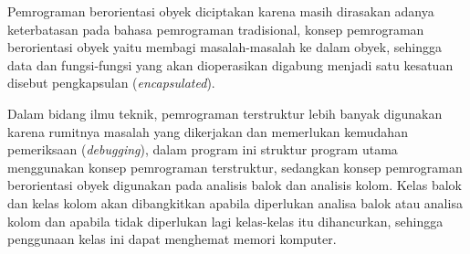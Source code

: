 Pemrograman berorientasi obyek diciptakan karena masih dirasakan adanya
keterbatasan pada bahasa pemrograman tradisional, konsep pemrograman
berorientasi obyek yaitu membagi masalah-masalah ke dalam obyek, sehingga
data dan fungsi-fungsi yang akan dioperasikan digabung menjadi satu
kesatuan disebut pengkapsulan (\textit{encapsulated}).

Dalam bidang ilmu teknik, pemrograman terstruktur lebih banyak digunakan
karena rumitnya masalah yang dikerjakan dan memerlukan kemudahan
pemeriksaan (\textit{debugging}), dalam program ini struktur program utama
menggunakan konsep pemrograman terstruktur, sedangkan konsep pemrograman
berorientasi obyek digunakan pada analisis balok dan analisis kolom. Kelas
balok dan kelas kolom akan dibangkitkan apabila diperlukan analisa balok
atau analisa kolom dan apabila tidak diperlukan lagi kelas-kelas itu
dihancurkan, sehingga penggunaan kelas ini dapat menghemat memori komputer.

